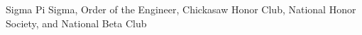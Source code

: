 \begin{cventries}
  \cventry
    {}
    {Sigma Pi Sigma, Order of the Engineer, Chickasaw Honor Club, National Honor Society, and National Beta Club}
    {}
    {}
    {}
\end{cventries}
